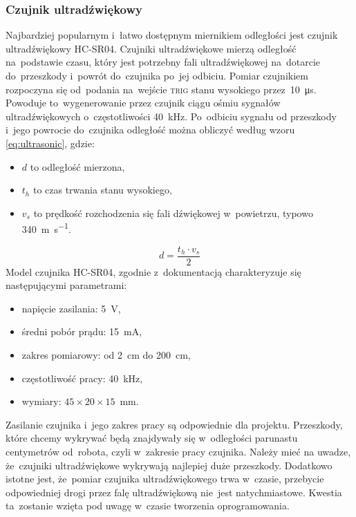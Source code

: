 \documentclass[11pt]{article}
\begin{document}
\subsubsection{Czujnik ultradźwiękowy}
Najbardziej popularnym i~łatwo dostępnym miernikiem odległości jest czujnik ultradźwiękowy HC-SR04.
Czujniki ultradźwiękowe mierzą odległość na~podstawie czasu, który jest potrzebny fali ultradźwiękowej na~dotarcie do~przeszkody i~powrót do~czujnika po~jej odbiciu.
Pomiar czujnikiem rozpoczyna się od~podania na~wejście \textsc{trig} stanu wysokiego przez~10~\si{\micro\second}. Powoduje to~wygenerowanie przez czujnik ciągu ośmiu sygnałów ultradźwiękowych o~częstotliwości 40~\si{\kilo\hertz}. Po~odbiciu sygnału od przeszkody i~jego powrocie do~czujnika odległość można obliczyć według wzoru \ref{eq:ultrasonic}, gdzie:
\begin{itemize}
	\item $ d $ to odległość mierzona,
	\item $ t_h $ to czas trwania stanu wysokiego, 
	\item $ v_s $ to prędkość rozchodzenia się fali dźwiękowej w~powietrzu, typowo 340~\si{\meter\per\second}.
\end{itemize}
\begin{equation}
\label{eq:ultrasonic}
	d = \frac{t_h \cdot v_s}{2}
\end{equation}
Model czujnika HC-SR04, zgodnie z~dokumentacją \cite{ultr_datasheet} charakteryzuje się następującymi parametrami:
\begin{itemize}
	\item napięcie zasilania: 5~\si{\volt},
	\item średni pobór prądu: 15~\si{\milli\ampere},
	\item zakres pomiarowy: od 2~\si{\centi\meter} do 200~\si{\centi\meter},
	\item częstotliwość pracy: 40~\si{\kilo\hertz},
	\item wymiary: $ 45 \times 20 \times 15 $~\si{\milli\meter}.
\end{itemize}
Zasilanie czujnika  i~jego zakres pracy są odpowiednie dla projektu.
Przeszkody, które chcemy wykrywać będą znajdywały się w~odległości parunastu centymetrów od~robota, czyli w~zakresie pracy czujnika.
Należy mieć na uwadze, że~czujniki ultradźwiękowe wykrywają najlepiej duże przeszkody. 
Dodatkowo istotne jest, że~pomiar czujnika ultradźwiękowego trwa w~czasie, przebycie odpowiedniej drogi przez falę ultradźwiękową nie~jest natychmiastowe.
Kwestia ta~zostanie wzięta pod uwagę w~czasie tworzenia oprogramowania.
\end{document}
